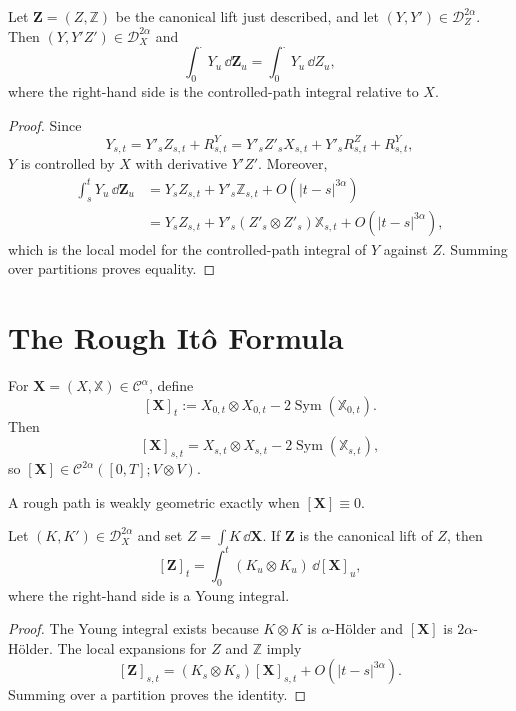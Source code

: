 \begin{lem}
Let $\mathbf Z=(Z,\mathbb Z)$ be the canonical lift just described, and let
$(Y,Y')\in\mathscr D_Z^{2\alpha}$.  Then
$(Y,Y'Z')\in\mathscr D_X^{2\alpha}$ and
\[
  \int_0^\cdot Y_u\,\dd\mathbf Z_u
  =\int_0^\cdot Y_u\,\dd Z_u,
\]
where the right-hand side is the controlled-path integral relative to $X$.
\end{lem}

\begin{proof}
Since
\[
  Y_{s,t}=Y'_sZ_{s,t}+R^Y_{s,t}
  =Y'_sZ'_sX_{s,t}+Y'_sR^Z_{s,t}+R^Y_{s,t},
\]
$Y$ is controlled by $X$ with derivative $Y'Z'$.  Moreover,
\begin{align*}
\int_s^tY_u\,\dd\mathbf Z_u
&=Y_sZ_{s,t}+Y'_s\mathbb Z_{s,t}+O(|t-s|^{3\alpha})\\
&=Y_sZ_{s,t}+Y'_s(Z'_s\otimes Z'_s)\mathbb X_{s,t}
  +O(|t-s|^{3\alpha}),
\end{align*}
which is the local model for the controlled-path integral of $Y$ against $Z$.
Summing over partitions proves equality.
\end{proof}

\section{The Rough It\^o Formula}

\begin{de}[Bracket]
For $\mathbf X=(X,\mathbb X)\in\mathscr C^\alpha$, define
\[
  [\mathbf X]_t
  :=X_{0,t}\otimes X_{0,t}-2\operatorname{Sym}(\mathbb X_{0,t}).
\]
Then
\[
  [\mathbf X]_{s,t}
  =X_{s,t}\otimes X_{s,t}-2\operatorname{Sym}(\mathbb X_{s,t}),
\]
so $[\mathbf X]\in\mathcal C^{2\alpha}([0,T];V\otimes V)$.
\end{de}

A rough path is weakly geometric exactly when $[\mathbf X]\equiv0$.

\begin{lem}
Let $(K,K')\in\mathscr D_X^{2\alpha}$ and set
$Z=\int K\,\dd\mathbf X$.  If $\mathbf Z$ is the canonical lift of $Z$, then
\[
  [\mathbf Z]_t
  =\int_0^t(K_u\otimes K_u)\,\dd[\mathbf X]_u,
\]
where the right-hand side is a Young integral.
\end{lem}

\begin{proof}
The Young integral exists because $K\otimes K$ is $\alpha$-Hölder and
$[\mathbf X]$ is $2\alpha$-Hölder.  The local expansions for $Z$ and
$\mathbb Z$ imply
\[
  [\mathbf Z]_{s,t}
  =(K_s\otimes K_s)[\mathbf X]_{s,t}+O(|t-s|^{3\alpha}).
\]
Summing over a partition proves the identity.
\end{proof}

